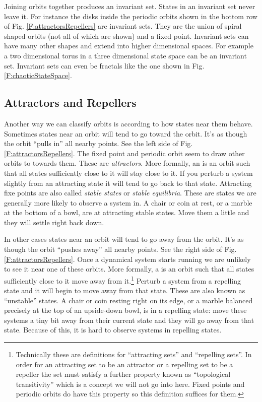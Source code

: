    Joining orbits together produces an invariant set.  States in an invariant
set never leave it.  For instance the disks inside the periodic orbits shown in
the bottom row of Fig. \ref{F:attractorsRepellers} are invariant sets.  They
are the union of spiral shaped orbits (not all of which are shown) and a fixed 
point.  Invariant sets can have many other shapes and extend into higher 
dimensional spaces.  For example a two dimensional torus in a three dimensional 
state space can be an invariant set.  
Invariant sets can even be fractals like the one shown in Fig. \ref{F:chaoticStateSpace}.


\subsection{Attractors and Repellers}

   Another way we can classify orbits is according to how states near  them behave. Sometimes states near an orbit will tend to  go toward the orbit. It's as though the orbit ``pulls in'' all nearby points. See the left side of Fig. \ref{F:attractorsRepellers}. The fixed point and periodic orbit seem to draw other orbits to towards them. These are \emph{attractors}. More formally, an  is an orbit such that all states sufficiently close to it will stay close to it. If you perturb a system slightly from an attracting state it will tend to go back to that state. Attracting fixe points are also called \emph{stable states} or \emph{stable equilibria}. These are states we are generally more likely to observe a system in. A chair or coin at rest, or a marble at the bottom of a bowl, are at attracting stable states. Move them a little and they will settle right back down. 

 In other cases states near an orbit will tend to go away from the orbit.
It's as though the orbit ``pushes away'' all nearby points. See the right side of Fig. \ref{F:attractorsRepellers}. Once a dynamical system starts running we are unlikely to see it near one of these 
orbits. More formally, a  is an orbit such that all states sufficiently close 
to it move away from it.\footnote{Technically these are definitions for 
``attracting sets'' and ``repelling sets''. In order for an attracting set to 
be an attractor or a repelling set to be a repeller the set must satisfy a 
further property known as ``topological transitivity'' which is a concept we
will not go into here. Fixed points and periodic orbits do have this property 
so this definition suffices for them.}  Perturb a system from a repelling state and it will begin to move away from that state. These are also known as ``unstable'' states. A chair or coin resting right on its edge, or a marble balanced precisely at the top of an upside-down bowl, is in a repelling state: move these systems a tiny bit away from their current state and they will go away from that state. Because of this, it is hard to observe systems in repelling states.

